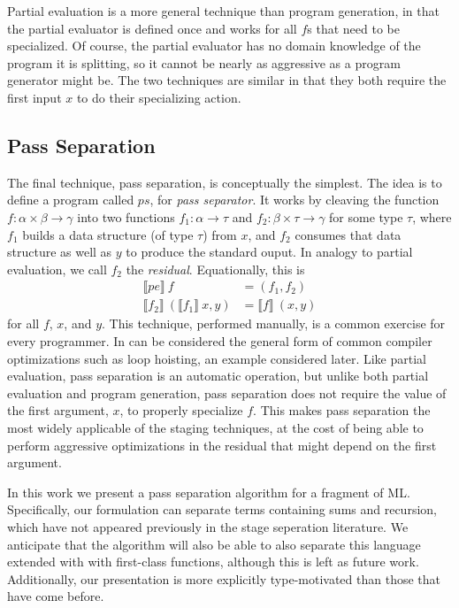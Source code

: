 \documentclass{article}
\begin{document}
Partial evaluation is a more general technique than program generation, in that the partial evaluator is defined once and works for all $f$s that need to be specialized.  Of course, the partial evaluator has no domain knowledge of the program it is splitting, so it cannot be nearly as aggressive as a program generator might be.  The two techniques are similar in that they both require the first input $x$ to do their specializing action.

\subsection {Pass Separation} 
The final technique, pass separation, is conceptually the simplest.  The idea is to define a program called $ps$, for {\em pass separator}. It works by cleaving the function $f:\alpha \times \beta \to \gamma$ into two functions $f_1 : \alpha \to \tau$ and $f_2 : \beta \times \tau \to \gamma$ for some type $\tau$, where $f_1$ builds a data structure (of type $\tau$) from $x$, and $f_2$ consumes that data structure as well as $y$ to produce the standard ouput.  In analogy to partial evaluation, we call $f_2$ the {\em residual}.  Equationally, this is
\begin{align*}
\llbracket pe\rrbracket~f &= (f_1,f_2) \\
\llbracket f_2\rrbracket~(\llbracket f_1\rrbracket~x,y) &= \llbracket f\rrbracket~(x,y)
\end{align*}
for all $f$, $x$, and $y$.  This technique, performed manually, is a common exercise for every programmer.  In can be considered the general form of common compiler optimizations such as loop hoisting, an example considered later.  Like partial evaluation, pass separation is an automatic operation, but unlike both partial evaluation and program generation, pass separation does not require the value of the first argument, $x$, to properly specialize $f$.  This makes pass separation the most widely applicable of the staging techniques, at the cost of being able to perform aggressive optimizations in the residual that might depend on the first argument. 

In this work we present a pass separation algorithm for a fragment of ML.  Specifically, our formulation can separate terms containing sums and recursion, which have not appeared previously in the stage seperation literature.  We anticipate that the algorithm will also be able to also separate this language extended with with first-class functions, although this is left as future work.  Additionally, our presentation is more explicitly type-motivated than those that have come before.
\end{document}
